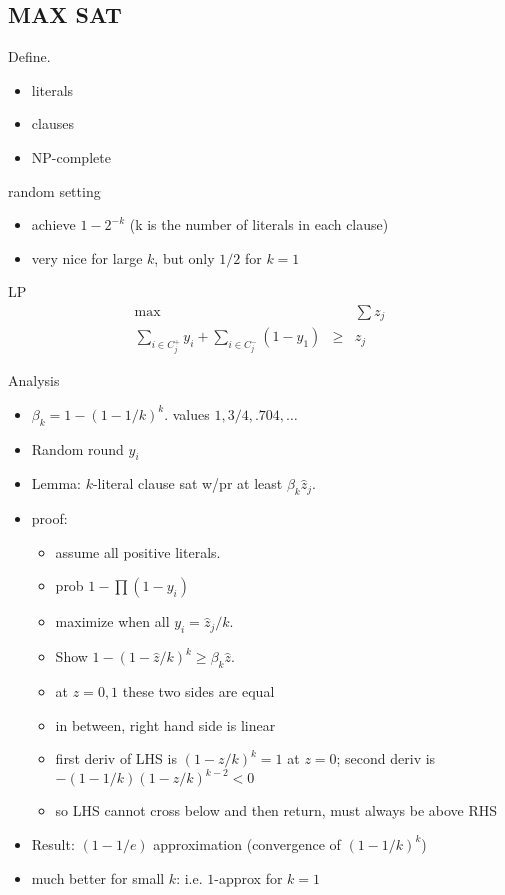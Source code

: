 \documentclass{article}
\def\zhat{{\hat z}}
\begin{document}


\subsection*{MAX SAT}

Define.
\begin{itemize}
\item literals 
\item clauses
\item NP-complete 
\end{itemize}


random setting
\begin{itemize}
\item achieve $1-2^{-k}$ (k is the number of literals in each clause)
\item very nice for large $k$, but only $1/2$ for $k=1$
\end{itemize}

LP
\begin{eqnarray*}
  \max &&\sum z_j\\
  \sum_{i \in C_j^+} y_i + \sum_{i \in C_j^-} (1-y_1) &\ge &z_j
\end{eqnarray*}

Analysis
\begin{itemize}
\item $\beta_k = 1-(1-1/k)^k$.  values $1,3/4,.704,\ldots$
\item Random round $y_i$
\item Lemma:  $k$-literal clause sat w/pr at least $\beta_k
  \zhat_j$.
\item proof: 
  \begin{itemize}
  \item assume all positive literals. 
  \item prob $1-\prod(1-y_i)$
  \item maximize when all $y_i=\zhat_j/k$.
  \item Show $1-(1-\zhat/k)^k \ge \beta_k \zhat$.
  \item at $z=0,1$ these two sides are equal
  \item in between, right hand side is linear
  \item first deriv of LHS is $(1-z/k)^k=1$ at $z=0$; second deriv is
    $-(1-1/k)(1-z/k)^{k-2}<0$
  \item so LHS cannot cross below and then return, must always be
  above RHS
  \end{itemize} 
\item Result: $(1-1/e)$ approximation (convergence of $(1-1/k)^k$)
\item much better for small $k$: i.e. $1$-approx for $k=1$
\end{itemize}
\end{document}
